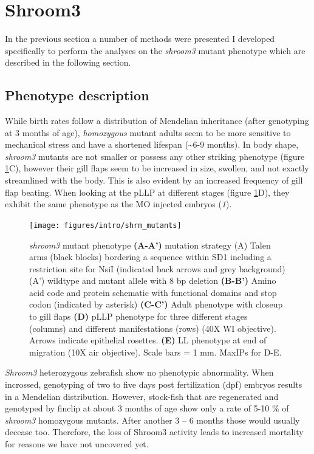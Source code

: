 \documentclass[10pt, b5paper, singlespacinge, twoside]{reedthesis} %
\theoremstyle{definition}
\theoremstyle{definition}
\theoremstyle{definition}
\theoremstyle{remark}
\begin{document}
\hypertarget{shroom3}{%
\section{Shroom3}\label{shroom3}}

In the previous section a number of methods were presented I developed specifically to perform the analyses on the \emph{shroom3} mutant phenotype which are described in the following section.

\hypertarget{intro-phen}{%
\subsection{Phenotype description}\label{intro-phen}}

While birth rates follow a distribution of Mendelian inheritance (after genotyping at 3 months of age), \emph{homozygous} mutant adults seem to be more sensitive to mechanical stress and have a shortened lifespan (\textasciitilde6-9 months). In body shape, \emph{shroom3} mutants are not smaller or possess any other striking phenotype (figure \ref{fig:shrmmut}C), however their gill flaps seem to be increased in size, swollen, and not exactly streamlined with the body. This is also evident by an increased frequency of gill flap beating. When looking at the pLLP at different stages (figure \ref{fig:shrmmut}D), they exhibit the same phenotype as the MO injected embryos (\emph{1}).


\begin{figure}

{\centering \texttt{[image: figures/intro/shrm\_mutants]} 

}

\caption[shroom3 mutant phenotype]{\emph{shroom3} mutant phenotype \textbf{(A-A')} mutation strategy (A) Talen arms (black blocks) bordering a sequence within SD1 including a restriction site for NsiI (indicated back arrows and grey background) (A') wildtype and mutant allele with 8 bp deletion \textbf{(B-B')} Amino acid code and protein schematic with functional domains and stop codon (indicated by asterisk) \textbf{(C-C')} Adult phenotype with closeup to gill flaps \textbf{(D)} pLLP phenotype for three different stages (columns) and different manifestations (rows) (40X WI objective). Arrows indicate epithelial rosettes. \textbf{(E)} LL phenotype at end of migration (10X air objective). Scale bars = 1 mm. MaxIPs for D-E.}\label{fig:shrmmut}
\end{figure}
\emph{Shroom3} heterozygous zebrafish show no phenotypic abnormality. When incrossed, genotyping of two to five days post fertilization (dpf) embryos results in a Mendelian distribution. However, stock-fish that are regenerated and genotyped by finclip at about 3 months of age show only a rate of 5-10 \(\%\) of \emph{shroom3} homozygous mutants. After another 3 -- 6 months those would usually decease too. Therefore, the loss of Shroom3 activity leads to increased mortality for reasons we have not uncovered yet.
\end{document}
